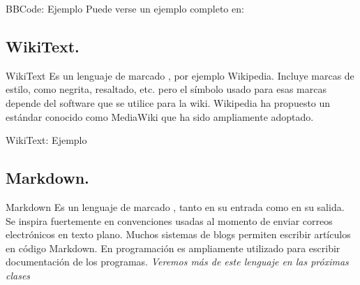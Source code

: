 
\begin{frame}{BBCode: Ejemplo}
  Puede verse un ejemplo completo en:
\end{frame}


\subsection{WikiText.}


\begin{frame}{WikiText}
  Es un lenguaje de marcado ,
  por ejemplo Wikipedia.
  \jump
  Incluye marcas de estilo, como negrita, resaltado, etc. pero el símbolo usado
  para esas marcas depende del software que se utilice para la wiki.
  \jump
  Wikipedia ha propuesto un estándar conocido como MediaWiki que ha sido
  ampliamente adoptado.
\end{frame}


\begin{frame}{WikiText: Ejemplo}
\end{frame}


\subsection{Markdown.}


\begin{frame}{Markdown}
  Es un lenguaje de marcado ,
  tanto en su entrada como en su salida.
  \jump
  Se inspira fuertemente en convenciones usadas al momento de enviar correos
  electrónicos en texto plano.
  \jump
  Muchos sistemas de blogs permiten escribir artículos en código Markdown.
  \jump
  En programación es ampliamente utilizado para escribir documentación de los
  programas.
  \jump
  \textit{Veremos más de este lenguaje en las próximas clases}
\end{frame}

